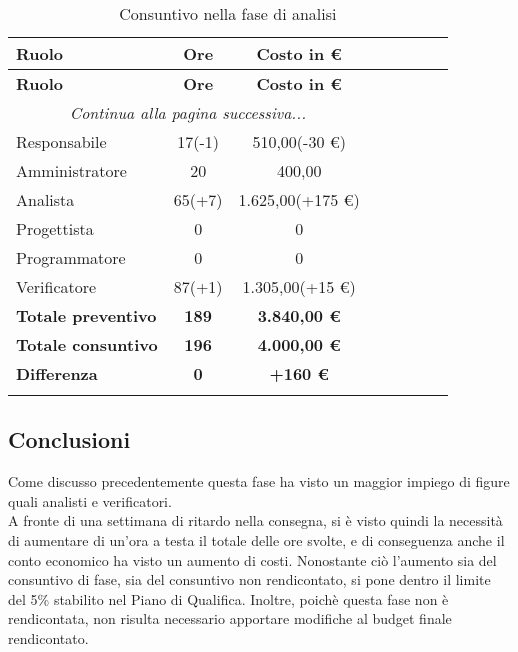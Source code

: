 \documentclass[../piano_di_progetto.tex]{subfiles}
\begin{document}
\begin{center}
	\begin{longtable}{|l|c|c|c|c|c|c|c|}
		\hline
		\rowcolor{lightgray}
		\textbf{Ruolo} & \textbf{Ore} & \textbf{Costo in €}\\
		\hline

		\endfirsthead
	
		\hline
		\rowcolor{lightgray}
		\textbf{Ruolo} & \textbf{Ore} & \textbf{Costo in €}\\
		\hline
		\endhead
		
		\hline
		\multicolumn{3}{|c|}{\emph{Continua alla pagina successiva...}}\\
		\hline
		\endfoot

		\endlastfoot

		Responsabile & 17(-1) & 510,00(-30 €) \\
		Amministratore & 20 & 400,00 \\
		Analista & 65(+7) & 1.625,00(+175 €) \\
		Progettista & 0 & 0 \\
		Programmatore & 0 & 0 \\
		Verificatore & 87(+1) & 1.305,00(+15 €) \\
		\textbf{Totale preventivo} & \textbf{189} & \textbf{3.840,00 €} \\
		\textbf{Totale consuntivo} & \textbf{196} & \textbf{4.000,00 €} \\
		\textbf{Differenza} & \textbf{0} & \textbf{+160 €}\\
		\hline
		\rowcolor{white}
		\caption{Consuntivo nella fase di analisi}
	\end{longtable}
\end{center}

\subsection{ Conclusioni}%
\label{sub:cons_fine}
Come discusso precedentemente questa fase ha visto un maggior impiego di figure quali analisti e verificatori.\\
A fronte di una settimana di ritardo nella consegna, si è visto quindi la necessità di aumentare di un'ora a testa il totale delle ore svolte, e di conseguenza anche il conto economico ha visto un aumento di costi. Nonostante ciò l'aumento sia del consuntivo di fase, sia del consuntivo non rendicontato, si pone dentro il limite del 5\% stabilito nel Piano di Qualifica. Inoltre, poichè questa fase non è rendicontata, non risulta necessario apportare modifiche al budget finale rendicontato.
\end{document}
